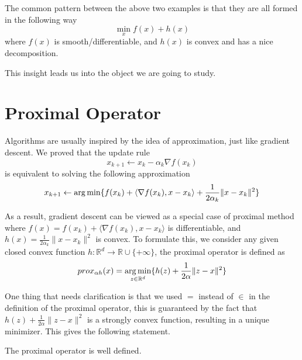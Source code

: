 \begin{remark}
    The common pattern between the above two examples is that they are all formed in the following way
    \begin{equation*}
        \min_{x} f(x) + h(x)
    \end{equation*}
    where $f(x)$ is smooth/differentiable, and $h(x)$ is convex and has a nice decomposition. 
\end{remark}

This insight leads us into the object we are going to study.

\section{Proximal Operator}
Algorithms are usually inspired by the idea of approximation, just like gradient descent. We proved that the update rule
\begin{equation*}
    x_{k+1} \leftarrow x_k - \alpha_k \nabla f(x_k)
\end{equation*}
is equivalent to solving the following approximation 
\begin{equation*}
    x_{k+1} \leftarrow \operatorname*{arg\,min} \{ f(x_{k}) + \langle \nabla f(x_k), x-x_k \rangle + \frac{1}{2\alpha_k}\|x - x_k\|^2 \}
\end{equation*}

As a result, gradient descent can be viewed as a special case of proximal method where $f(x) = f(x_{k}) + \langle \nabla f(x_k), x-x_k \rangle$ is differentiable, and $h(x) = \frac{1}{2\alpha_k}\|x - x_k\|^2$ is convex. To formulate this, we consider any given closed convex function $h : \mathbb{R}^d \rightarrow \mathbb{R}\cup\{+\infty\}$, the proximal operator is defined as
\begin{equation}
    prox_{\alpha h}(x) = \operatorname*{arg\,min}_{z \in \mathbb{R}^d} \{ h(z) + \frac{1}{2\alpha}\|z - x \|^2 \}
\end{equation}

One thing that needs clarification is that we used $=$ instead of $\in$ in the definition of the proximal operator, this is guaranteed by the fact that $h(z) + \frac{1}{2\alpha}\|z - x \|^2$ is a strongly convex function, resulting in a unique minimizer. This gives the following statement.
\begin{lemma}
    The proximal operator is well defined.
\end{lemma}

